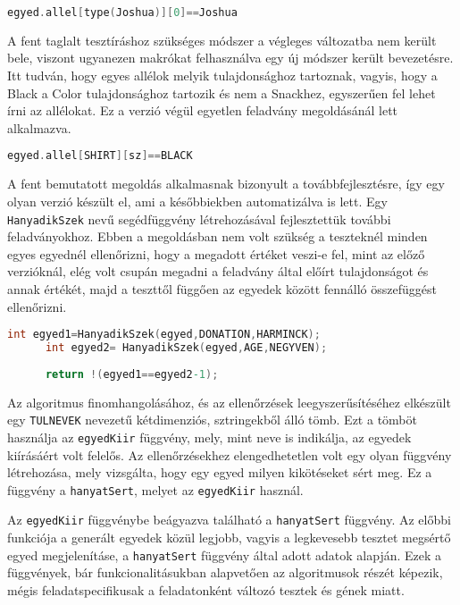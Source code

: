 \documentclass[12pt,a4paper,oneside]{report}
\begin{document}
	\begin{lstlisting}[frame=single, language=C]
	egyed.allel[type(Joshua)][0]==Joshua
	\end{lstlisting}


	A fent taglalt tesztíráshoz szükséges módszer a végleges változatba nem került bele, viszont ugyanezen makrókat felhasználva egy új módszer került bevezetésre. Itt tudván, hogy egyes allélok melyik tulajdonsághoz tartoznak, vagyis, hogy a Black a Color tulajdonsághoz tartozik és nem a Snackhez, egyszerűen fel lehet írni az allélokat. Ez a verzió végül egyetlen feladvány megoldásánál lett alkalmazva.
	\begin{lstlisting}[frame=single, language=C]
	egyed.allel[SHIRT][sz]==BLACK
	\end{lstlisting}

	A fent bemutatott megoldás alkalmasnak bizonyult a továbbfejlesztésre, így egy olyan verzió készült el, ami a későbbiekben automatizálva is lett. Egy \texttt{HanyadikSzek} nevű segédfüggvény létrehozásával fejlesztettük további feladványokhoz. Ebben a megoldásban nem volt szükség a teszteknél minden egyes egyednél ellenőrizni, hogy a megadott értéket veszi-e fel, mint az előző verzióknál, elég volt csupán megadni a feladvány által előírt tulajdonságot és annak értékét, majd a teszttől függően az egyedek között fennálló összefüggést ellenőrizni.
	\begin{lstlisting}[frame=single, language=C]
  	  int egyed1=HanyadikSzek(egyed,DONATION,HARMINCK);
   	  int egyed2= HanyadikSzek(egyed,AGE,NEGYVEN);
	
	  return !(egyed1==egyed2-1);
	\end{lstlisting}


	Az algoritmus finomhangolásához, és az ellenőrzések leegyszerűsítéséhez elkészült egy \texttt{TULNEVEK} nevezetű kétdimenziós, sztringekből álló tömb. Ezt a tömböt használja az \texttt{egyedKiir} függvény, mely, mint neve is indikálja, az egyedek kiírásáért volt felelős. Az ellenőrzésekhez elengedhetetlen volt egy olyan függvény létrehozása, mely vizsgálta, hogy egy egyed milyen kikötéseket sért meg. Ez a függvény a \texttt{hanyatSert}, melyet az \texttt{egyedKiir} használ.

	Az  \texttt{egyedKiir} függvénybe beágyazva található a \texttt{hanyatSert} függvény. Az előbbi funkciója a generált egyedek közül legjobb, vagyis a legkevesebb tesztet megsértő egyed megjelenításe, a \texttt{hanyatSert} függvény által adott adatok alapján. Ezek a függvények, bár funkcionalitásukban alapvetően az algoritmusok részét képezik, mégis feladatspecifikusak a feladatonként változó tesztek és gének miatt.
\end{document}
